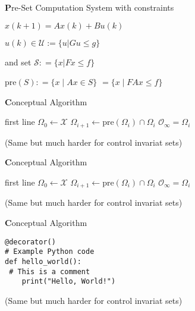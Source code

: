 \begin{minipage}[b]{0.495\linewidth}
	\begin{sstTitleBox}[ForestGreen]{\center\textbf
			Pre-Set Computation}
		System with constraints

		$x(k+1) = Ax(k) +Bu(k)$

		$u(k)\in\mathcal{U}:=\{u|Gu\le g\}$

		and set
		$\mathcal{S}: = \{x|Fx\leq f\}$

		$ 			\mathrm{pre}(S):  =  \{x \mid Ax \in S\}  $
		$ 			=  \{ x \mid FAx \leq f\}                 $
	\end{sstTitleBox}
\end{minipage}
\begin{minipage}[b]{0.49\linewidth}
	\begin{sstTitleBox}[ForestGreen]{\center\textbf
			Conceptual Algorithm}
		\begin{sstOnlyFrame}[ForestGreen]
			\begin{algorithmic}
				\State first line
				\State $\Omega_0 \leftarrow \mathcal{X}$
				\Loop
				\State $\Omega_{i+1} \leftarrow \mathrm{pre}(\Omega_i)\cap\Omega_i$
				\State\Return $\mathcal{O}_\infty = \Omega_i$
				\EndIf
				\EndLoop
			\end{algorithmic}
		\end{sstOnlyFrame}
		(Same but much harder for control invariat sets)
	\end{sstTitleBox}
\end{minipage}

\begin{sstTitleBox}[ForestGreen]{\center\textbf
		Conceptual Algorithm}
	\begin{sstOnlyFrame}[ForestGreen]
		\begin{algorithmic}
			\State first line
			\State $\Omega_0 \leftarrow \mathcal{X}$
			\Loop
			\State $\Omega_{i+1} \leftarrow \mathrm{pre}(\Omega_i)\cap\Omega_i$
			\If{$\Omega_{i+1}=\Omega_i$}
			\State\Return $\mathcal{O}_\infty = \Omega_i$
			\EndIf
			\EndLoop
		\end{algorithmic}
	\end{sstOnlyFrame}
	(Same but much harder for control invariat sets)
\end{sstTitleBox}

\begin{sstTitleBox}[ForestGreen]{\center\textbf
		Conceptual Algorithm}
	\begin{adjustbox}{rndcorners=0.5mm}
		\begin{lstlisting}[style=sst]
@decorator()
# Example Python code
def hello_world():
 # This is a comment
    print("Hello, World!")
\end{lstlisting}
	\end{adjustbox}

	(Same but much harder for control invariat sets)
\end{sstTitleBox}

